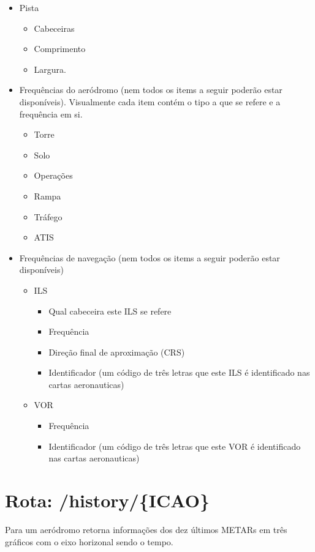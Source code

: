 \begin{itemize}
    \item Pista
        \begin {itemize}
        \item Cabeceiras
        \item Comprimento
        \item Largura.
        \end {itemize}
    \item Frequências do aeródromo (nem todos os items a seguir poderão estar disponíveis). Visualmente cada item contém o tipo a que se refere e a frequência em si.
    \begin{itemize}
        \item Torre
        \item Solo
        \item Operações
        \item Rampa
        \item Tráfego
        \item ATIS
    \end{itemize}
    \item Frequências de navegação (nem todos os items a seguir poderão estar disponíveis)
    \begin{itemize}
        \item ILS
            \begin{itemize}
                \item Qual cabeceira este ILS se refere
                \item Frequência
                \item Direção final de aproximação (CRS)
                \item Identificador (um código de três letras que este ILS é identificado nas cartas aeronauticas)
            \end{itemize}
        \item VOR
            \begin{itemize}
                \item Frequência
                \item Identificador (um código de três letras que este VOR é identificado nas cartas aeronauticas)
            \end{itemize}
    \end{itemize}

\end{itemize}

\section{Rota: /history/\{ICAO\}}
Para um aeródromo retorna informações dos dez últimos METARs em três
gráficos com o eixo horizonal sendo o tempo.

